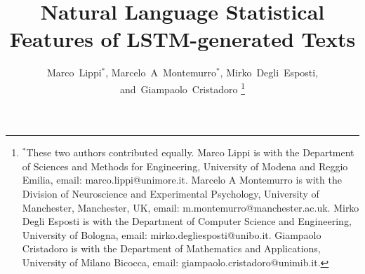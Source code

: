 \documentclass[journal]{IEEEtran}
\begin{document}
%

\title{Natural Language Statistical Features of LSTM-generated Texts}

%

\author{Marco~Lippi$^*$,
	Marcelo~A~Montemurro$^*$,
        Mirko~Degli~Esposti,
	and~Giampaolo~Cristadoro%
\thanks{$^*$These two authors contributed equally. Marco Lippi is with the
Department of Sciences and Methods for Engineering, University of Modena and
Reggio Emilia, email: marco.lippi@unimore.it. Marcelo A Montemurro is with the
Division of Neuroscience and Experimental Psychology, University of Manchester,
Manchester, UK, email: m.montemurro@manchester.ac.uk. Mirko Degli Esposti is
with the Department of Computer Science and Engineering, University of Bologna,
email: mirko.degliesposti@unibo.it. Giampaolo Cristadoro is with the Department
of Mathematics and Applications, University of Milano Bicocca, email:
giampaolo.cristadoro@unimib.it.}%
}


%
%
\end{document}
